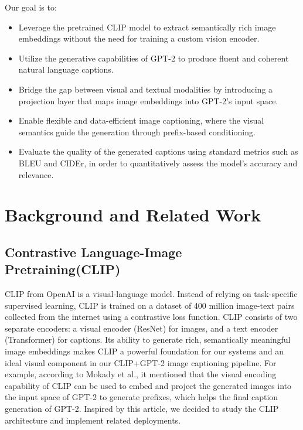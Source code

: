 \documentclass[11pt]{article}
\begin{document}
Our goal is to:
\begin{itemize}
    \item Leverage the pretrained CLIP model to extract semantically rich image embeddings without the need for training a custom vision encoder.
    \item Utilize the generative capabilities of GPT-2 to produce fluent and coherent natural language captions.
    \item Bridge the gap between visual and textual modalities by introducing a projection layer that maps image embeddings into GPT-2's input space.
    \item Enable flexible and data-efficient image captioning, where the visual semantics guide the generation through prefix-based conditioning.
    \item Evaluate the quality of the generated captions using standard metrics such as BLEU and CIDEr, in order to quantitatively assess the model's accuracy and relevance.
\end{itemize}
\pagebreak
\section{Background and Related Work}

    \subsection{Contrastive Language-Image Pretraining(CLIP)}
    CLIP from OpenAI is a visual-language model. Instead of relying on 
    task-specific supervised learning, CLIP is trained on a dataset of 400
    million image-text pairs collected from the internet using a contrastive 
    loss function. CLIP consists of two separate encoders: a visual encoder 
    (ResNet) for images, and a text encoder (Transformer) for captions. 
    Its ability to generate rich, semantically meaningful image 
    embeddings makes CLIP a powerful foundation for our systems and 
    an ideal visual component in our CLIP+GPT-2 image captioning pipeline. 
    For example, according to Mokady et al.\cite{Mokady2021}, it mentioned that the visual encoding capability of 
    CLIP can be used to embed and project the generated images into the input 
    space of GPT-2 to generate prefixes, which helps the final caption generation of GPT-2. Inspired by this article, we decided to study the CLIP architecture and implement related deployments.
\end{document}
